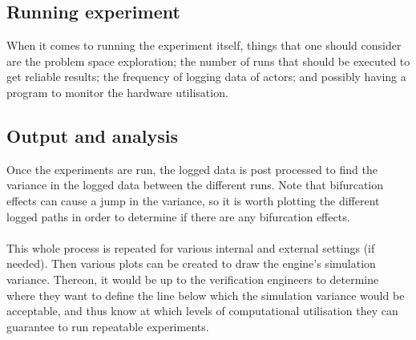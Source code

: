 \subsection{Running experiment}
\noindent When it comes to running the experiment itself, things that one should consider are the problem space exploration; the number of runs that should be executed to get reliable results; the frequency of logging data of actors; and possibly having a program to monitor the hardware utilisation.

\subsection{Output and analysis}
\noindent Once the experiments are run, the logged data is post processed to find the variance in the logged data between the different runs. Note that bifurcation effects can cause a jump in the variance, so it is worth plotting the different logged paths in order to determine if there are any bifurcation effects.\\\\
This whole process is repeated for various internal and external settings (if needed). 
Then various plots can be created to draw the engine's simulation variance. 
Thereon, it would be up to the verification engineers to determine where they want to define the line below which the simulation variance would be acceptable, and thus know at which levels of computational utilisation they can guarantee to run repeatable experiments.   

